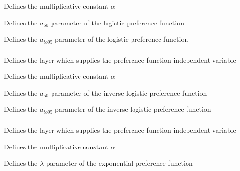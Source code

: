  {Defines the multiplicative constant $\alpha$}

 {Defines the $a_{50}$ parameter of the logistic preference function}

 {Defines the $a_{to95}$ parameter of the logistic preference function}

\subsubsection[Inverse-logistic]{}

 {Defines the layer which supplies the preference function independent variable}

 {Defines the multiplicative constant $\alpha$}

 {Defines the $a_{50}$ parameter of the inverse-logistic preference function}

 {Defines the $a_{to95}$ parameter of the inverse-logistic preference function}

\subsubsection[Exponential]{}

 {Defines the layer which supplies the preference function independent variable}

 {Defines the multiplicative constant $\alpha$}

 {Defines the $\lambda$ parameter of the exponential preference function}

\subsubsection[Threshold]{}

